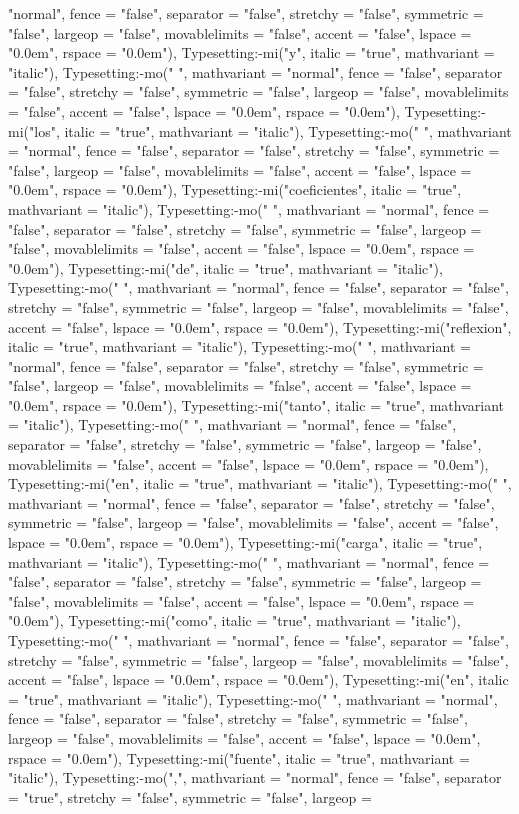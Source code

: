 \documentclass{article}
\begin{document}
\begin{Maple Normal}
{\begin{Maple Normal}
{"normal", fence = "false", separator = "false", stretchy = "false", symmetric = "false", largeop = "false", movablelimits = "false", accent = "false", lspace = "0.0em", rspace = "0.0em"), Typesetting:-mi("y", italic = "true", mathvariant = "italic"), Typesetting:-mo(" ", mathvariant = "normal", fence = "false", separator = "false", stretchy = "false", symmetric = "false", largeop = "false", movablelimits = "false", accent = "false", lspace = "0.0em", rspace = "0.0em"), Typesetting:-mi("los", italic = "true", mathvariant = "italic"), Typesetting:-mo(" ", mathvariant = "normal", fence = "false", separator = "false", stretchy = "false", symmetric = "false", largeop = "false", movablelimits = "false", accent = "false", lspace = "0.0em", rspace = "0.0em"), Typesetting:-mi("coeficientes", italic = "true", mathvariant = "italic"), Typesetting:-mo(" ", mathvariant = "normal", fence = "false", separator = "false", stretchy = "false", symmetric = "false", largeop = "false", movablelimits = "false", accent = "false", lspace = "0.0em", rspace = "0.0em"), Typesetting:-mi("de", italic = "true", mathvariant = "italic"), Typesetting:-mo(" ", mathvariant = "normal", fence = "false", separator = "false", stretchy = "false", symmetric = "false", largeop = "false", movablelimits = "false", accent = "false", lspace = "0.0em", rspace = "0.0em"), Typesetting:-mi("reflexion", italic = "true", mathvariant = "italic"), Typesetting:-mo(" ", mathvariant = "normal", fence = "false", separator = "false", stretchy = "false", symmetric = "false", largeop = "false", movablelimits = "false", accent = "false", lspace = "0.0em", rspace = "0.0em"), Typesetting:-mi("tanto", italic = "true", mathvariant = "italic"), Typesetting:-mo(" ", mathvariant = "normal", fence = "false", separator = "false", stretchy = "false", symmetric = "false", largeop = "false", movablelimits = "false", accent = "false", lspace = "0.0em", rspace = "0.0em"), Typesetting:-mi("en", italic = "true", mathvariant = "italic"), Typesetting:-mo(" ", mathvariant = "normal", fence = "false", separator = "false", stretchy = "false", symmetric = "false", largeop = "false", movablelimits = "false", accent = "false", lspace = "0.0em", rspace = "0.0em"), Typesetting:-mi("carga", italic = "true", mathvariant = "italic"), Typesetting:-mo(" ", mathvariant = "normal", fence = "false", separator = "false", stretchy = "false", symmetric = "false", largeop = "false", movablelimits = "false", accent = "false", lspace = "0.0em", rspace = "0.0em"), Typesetting:-mi("como", italic = "true", mathvariant = "italic"), Typesetting:-mo(" ", mathvariant = "normal", fence = "false", separator = "false", stretchy = "false", symmetric = "false", largeop = "false", movablelimits = "false", accent = "false", lspace = "0.0em", rspace = "0.0em"), Typesetting:-mi("en", italic = "true", mathvariant = "italic"), Typesetting:-mo(" ", mathvariant = "normal", fence = "false", separator = "false", stretchy = "false", symmetric = "false", largeop = "false", movablelimits = "false", accent = "false", lspace = "0.0em", rspace = "0.0em"), Typesetting:-mi("fuente", italic = "true", mathvariant = "italic"), Typesetting:-mo(",", mathvariant = "normal", fence = "false", separator = "true", stretchy = "false", symmetric = "false", largeop = }
\end{Maple Normal}}
\end{Maple Normal}
\end{document}
